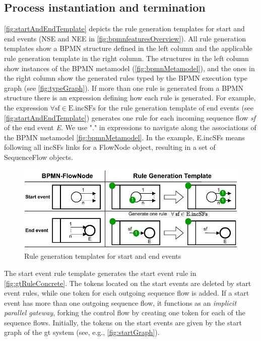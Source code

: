 \documentclass[runningheads]{llncs}
\begin{document}
\subsection{Process instantiation and termination} \label{subsec:instAndTermination}

\autoref{fig:startAndEndTemplate} depicts the rule generation templates for start and end events (\textsf{NSE} and \textsf{NEE} in \autoref{fig:bpmnfeaturesOverview}).
All rule generation templates show a BPMN structure defined in the left column and the applicable rule generation template in the right column.
The structures in the left column show instances of the BPMN metamodel (\autoref{fig:bpmnMetamodel}), and the ones in the right column show the generated rules typed by the BPMN execution type graph (see \autoref{fig:typeGraph}).
If more than one rule is generated from a BPMN structure there is an expression defining how each rule is generated.
For example, the expression $\forall \text{sf} \in \text{E.incSFs}$ for the rule generation template of end events (see \autoref{fig:startAndEndTemplate}) generates one rule for each incoming sequence flow \textit{sf} of the end event \textit{E}.
We use "." in expressions to navigate along the associations of the BPMN metamodel \autoref{fig:bpmnMetamodel}.
In the example, \textsf{E.incSFs} means following all \textsf{incSFs} links for a \textsf{FlowNode} object, resulting in a set of \textsf{SequenceFlow} objects.



\begin{figure}[ht]
    \centering
    \includegraphics[width=.8\textwidth]{images/start_end_template.pdf}
    \caption{Rule generation templates for start and end events}
    \label{fig:startAndEndTemplate}
\end{figure}

The start event rule template generates the start event rule in \autoref{fig:gtRuleConcrete}.
The tokens located on the start events are deleted by start event rules, while one token for each outgoing sequence flow is added.
If a start event has more than one outgoing sequence flow, it functions as an \textit{implicit parallel gateway}, forking the control flow by creating one token for each of the sequence flows.
Initially, the tokens on the start events are given by the start graph of the \gls*{gt} system (see, e.g., \autoref{fig:startGraph}).
    
\end{document}
